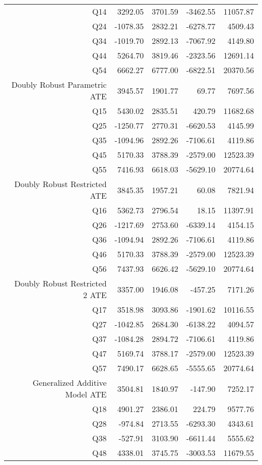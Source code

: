 \begin{table}[ht]
\begin{tabular}{rrrrr}
  Q14 & 3292.05 & 3701.59 & -3462.55 & 11057.87 \\ 
  Q24 & -1078.35 & 2832.21 & -6278.77 & 4509.43 \\ 
  Q34 & -1019.70 & 2892.13 & -7067.92 & 4149.80 \\ 
  Q44 & 5264.70 & 3819.46 & -2323.56 & 12691.14 \\ 
  Q54 & 6662.27 & 6777.00 & -6822.51 & 20370.56 \\ 
  Doubly Robust Parametric ATE & 3945.57 & 1901.77 & 69.77 & 7697.56 \\ 
  Q15 & 5430.02 & 2835.51 & 420.79 & 11682.68 \\ 
  Q25 & -1250.77 & 2770.31 & -6620.53 & 4145.99 \\ 
  Q35 & -1094.96 & 2892.26 & -7106.61 & 4119.86 \\ 
  Q45 & 5170.33 & 3788.39 & -2579.00 & 12523.39 \\ 
  Q55 & 7416.93 & 6618.03 & -5629.10 & 20774.64 \\ 
  Doubly Robust Restricted ATE & 3845.35 & 1957.21 & 60.08 & 7821.94 \\ 
  Q16 & 5362.73 & 2796.54 & 18.15 & 11397.91 \\ 
  Q26 & -1217.69 & 2753.60 & -6339.14 & 4154.15 \\ 
  Q36 & -1094.94 & 2892.26 & -7106.61 & 4119.86 \\ 
  Q46 & 5170.33 & 3788.39 & -2579.00 & 12523.39 \\ 
  Q56 & 7437.93 & 6626.42 & -5629.10 & 20774.64 \\ 
  Doubly Robust Restricted 2 ATE & 3357.00 & 1946.08 & -457.25 & 7171.26 \\ 
  Q17 & 3518.98 & 3093.86 & -1901.62 & 10116.55 \\ 
  Q27 & -1042.85 & 2684.30 & -6138.22 & 4094.57 \\ 
  Q37 & -1084.28 & 2894.72 & -7106.61 & 4119.86 \\ 
  Q47 & 5169.74 & 3788.17 & -2579.00 & 12523.39 \\ 
  Q57 & 7490.17 & 6628.65 & -5555.65 & 20774.64 \\ 
  Generalized Additive Model ATE & 3504.81 & 1840.97 & -147.90 & 7252.17 \\ 
  Q18 & 4901.27 & 2386.01 & 224.79 & 9577.76 \\ 
  Q28 & -974.84 & 2713.55 & -6293.30 & 4343.61 \\ 
  Q38 & -527.91 & 3103.90 & -6611.44 & 5555.62 \\ 
  Q48 & 4338.01 & 3745.75 & -3003.53 & 11679.55 \\ 

\end{tabular}
\end{table}
